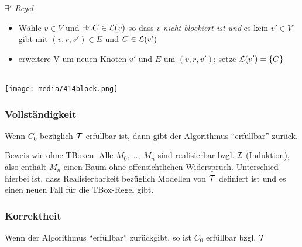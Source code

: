 \emph{$\exists'$-Regel}
\begin{itemize}
\item
  Wähle $v \in V$ und $\exists r.C \in \ML\left( v \right)$ so dass
  $v$ \emph{nicht blockiert ist und} es kein $v' \in V$ gibt mit
  $\left( v,r,v' \right) \in E$ und $C \in \ML\left( v' \right)$
\item
  erweitere V um neuen Knoten $v'$ und $E$ um
  $\left( v,r,v' \right)$; setze
  $\ML\left( v' \right) = \left\{ C \right\}$
\end{itemize}

\begin{tafel}\mbox{}\\

\texttt{[image: media/414block.png]}

\end{tafel}

\subsubsection{Vollständigkeit}\label{vollstuxe4ndigkeit}

\begin{theorem}
    Wenn $C_0$ bezüglich $\mathcal{T}$ erfüllbar ist, dann gibt der Algorithmus \enquote{erfüllbar} zurück.
\end{theorem}

Beweis wie ohne TBoxen: Alle $M_{0},\ldots,\ M_{n}$ sind realisierbar
bzgl. $\mathcal{I}$ (Induktion), also enthält $M_{n}$ einen Baum ohne
offensichtlichen Widerspruch. Unterschied hierbei ist, dass Realisierbarkeit bezüglich Modellen von $\mathcal{T}$ definiert ist und es einen neuen Fall für die TBox-Regel gibt.

\subsubsection{Korrektheit}\label{korrektheit}

\begin{theorem}
    Wenn der Algorithmus \enquote{erfüllbar} zurückgibt, so ist $C_0$ erfüllbar bzgl. $\mathcal{T}$
\end{theorem}

